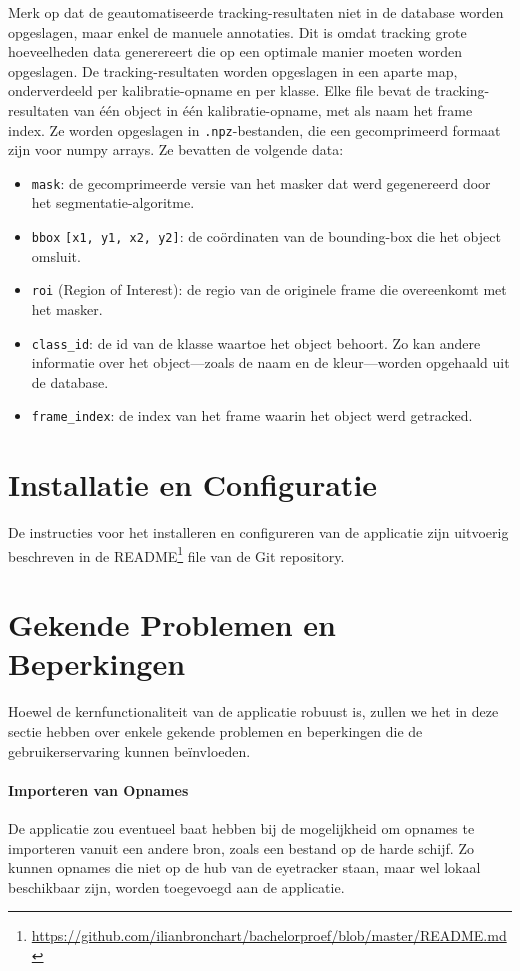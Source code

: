 Merk op dat de geautomatiseerde tracking-resultaten niet in de database worden opgeslagen, maar enkel de manuele annotaties.
Dit is omdat tracking grote hoeveelheden data generereert die op een optimale manier moeten worden opgeslagen.
De tracking-resultaten worden opgeslagen in een aparte map, onderverdeeld per kalibratie-opname en per klasse.
Elke file bevat de tracking-resultaten van één object in één kalibratie-opname, met als naam het frame index.
Ze worden opgeslagen in \texttt{.npz}-bestanden, die een gecomprimeerd formaat zijn voor numpy arrays.
Ze bevatten de volgende data:
\begin{itemize}
  \item \texttt{mask}: de gecomprimeerde versie van het masker dat werd gegenereerd door het segmentatie-algoritme.
  \item \texttt{bbox} \texttt{[x1, y1, x2, y2]}: de coördinaten van de bounding-box die het object omsluit.
  \item \texttt{roi} (Region of Interest): de regio van de originele frame die overeenkomt met het masker.
  \item \texttt{class\_id}: de id van de klasse waartoe het object behoort. 
  Zo kan andere informatie over het object---zoals de naam en de kleur---worden opgehaald uit de database.
  \item \texttt{frame\_index}: de index van het frame waarin het object werd getracked.
\end{itemize}

\section{Installatie en Configuratie}

De instructies voor het installeren en configureren van de applicatie zijn uitvoerig beschreven in de README\footnote{\url{https://github.com/ilianbronchart/bachelorproef/blob/master/README.md}} file van de Git repository.

\section{Gekende Problemen en Beperkingen}

Hoewel de kernfunctionaliteit van de applicatie robuust is, zullen we het in deze sectie hebben 
over enkele gekende problemen en beperkingen die de gebruikerservaring kunnen beïnvloeden.

\paragraph{Importeren van Opnames}
De applicatie zou eventueel baat hebben bij de mogelijkheid om opnames te importeren vanuit een andere bron, zoals een bestand op de harde schijf.
Zo kunnen opnames die niet op de hub van de eyetracker staan, maar wel lokaal beschikbaar zijn, worden toegevoegd aan de applicatie.

